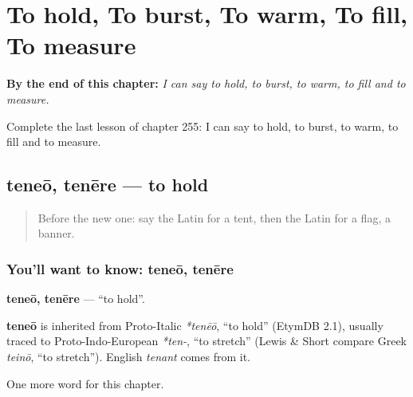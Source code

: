
\chapter{To hold, To burst, To warm, To fill, To measure}
\label{ch:la-to-hold-to-burst-to-warm-to-fill-to-measure}

\begin{chapteropening}
\textbf{By the end of this chapter:} \emph{I can say to hold, to burst, to warm, to fill and to measure.}

Complete the last lesson of chapter 255: I can say to hold, to burst, to warm, to fill and to measure.
\end{chapteropening}

\section[teneō, tenēre]{teneō, tenēre — to hold}

\label{lesson:LA-C255-teneo}



\begin{quote}
Before the new one: say the Latin for a tent, then the Latin for a flag, a banner.
\end{quote}

\subsection*{You'll want to know: teneō, tenēre}
\textbf{teneō, tenēre} — \textquotedblleft{}to hold\textquotedblright{}.

\begin{cousinweb}
\textbf{teneō} is inherited from Proto-Italic \emph{*tenēō}, \textquotedblleft{}to hold\textquotedblright{} (EtymDB 2.1), usually traced to Proto-Indo-European \emph{*ten-}, \textquotedblleft{}to stretch\textquotedblright{} (Lewis \& Short compare Greek \emph{teinō}, \textquotedblleft{}to stretch\textquotedblright{}). English \emph{tenant} comes from it.
\end{cousinweb}

\begin{grammarlens}[title={What you've built}]
One more word for this chapter.
\end{grammarlens}

